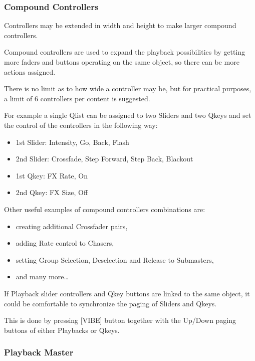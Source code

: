 \documentclass[
]{article}
\begin{document}
\hypertarget{compound-controllers}{%
\subsubsection{Compound Controllers}\label{compound-controllers}}

Controllers may be extended in width and height to make larger compound controllers.

Compound controllers are used to expand the playback possibilities by getting more faders and buttons operating on the same object, so there can be more actions assigned.

There is no limit as to how wide a controller may be, but for practical purposes, a limit of 6 controllers per content is suggested.

For example a single Qlist can be assigned to two Sliders and two Qkeys and set the control of the controllers in the following way:

\begin{itemize}
\item
  1st Slider: Intensity, Go, Back, Flash
\item
  2nd Slider: Crossfade, Step Forward, Step Back, Blackout
\item
  1st Qkey: FX Rate, On
\item
  2nd Qkey: FX Size, Off
\end{itemize}

Other useful examples of compound controllers combinations are:

\begin{itemize}
\item
  creating additional Crossfader pairs,
\item
  adding Rate control to Chasers,
\item
  setting Group Selection, Deselection and Release to Submasters,
\item
  and many more\ldots{}
\end{itemize}

If Playback slider controllers and Qkey buttons are linked to the same object, it could be comfortable to synchronize the paging of Sliders and Qkeys.

This is done by pressing {[}VIBE{]} button together with the Up/Down paging buttons of either Playbacks or Qkeys.

\hypertarget{playback-master}{%
\subsubsection{Playback Master}\label{playback-master}}
\end{document}

